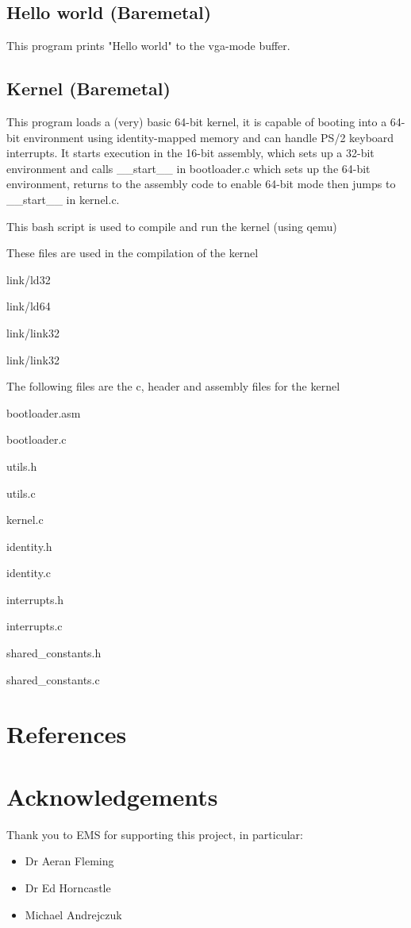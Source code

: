 \documentclass{article}
\newcommand{\layout}[1]{\parbox{\linewidth}{#1}}
\begin{document}


\subsection{Hello world (Baremetal)}
This program prints "Hello world" to the vga-mode buffer.



\subsection{Kernel (Baremetal)}
This program loads a (very) basic 64-bit kernel, it is capable of booting into a 64-bit environment using identity-mapped memory and can handle PS/2 keyboard interrupts. It starts execution in the 16-bit assembly, which sets up a 32-bit environment and calls \_\_start\_\_ in bootloader.c which sets up the 64-bit environment, returns to the assembly code to enable 64-bit mode then jumps to \_\_start\_\_ in kernel.c.

This bash script is used to compile and run the kernel (using qemu)


These files are used in the compilation of the kernel

link/ld32

link/ld64

link/link32

link/link32


\newcommand{\cfile}[1]{
  #1.c
  
}

\newcommand{\chfile}[1]{
  #1.h
  
  #1.c
  
}

The following files are the c, header and assembly files for the kernel

bootloader.asm


\cfile{bootloader}
\chfile{utils}
\cfile{kernel}
\chfile{identity}
\chfile{interrupts}
\chfile{shared\_constants}

\pagebreak

\section{References}




\layout{
  \section{Acknowledgements}

  Thank you to EMS for supporting this project, in particular:
  \begin{itemize}
    \item Dr Aeran Fleming
    \item Dr Ed Horncastle
    \item Michael Andrejczuk
  \end{itemize}
}
\end{document}
